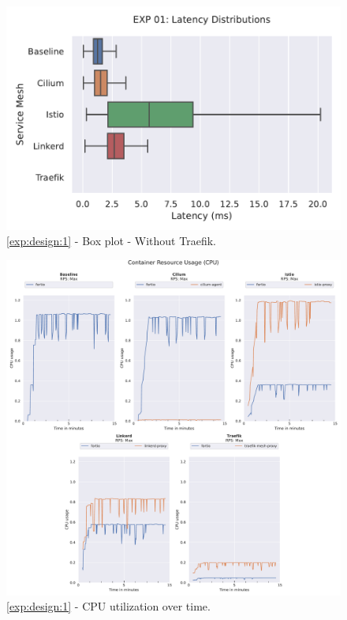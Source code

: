 \begin{figure}[h]
    \centering
    
    \includegraphics[width=\linewidth]{5_experimental_evaluation/figures/exp_01-latency-boxplot-no-traefik.pdf}

    \caption{\ref{exp:design:1} - Box plot - Without Traefik.}
    
    \label{fig:appendix:exp:result:01:latency:boxplot-no-traefik}
\end{figure}


\begin{figure}[h]
    \centering
    
    \includegraphics[width=\linewidth]{5_experimental_evaluation/figures/exp_01-cpu-results.pdf}

    \caption{\ref{exp:design:1} - CPU utilization over time.}
    
    \label{fig:appendix:exp:result:01:cpu:timeline}
\end{figure}


